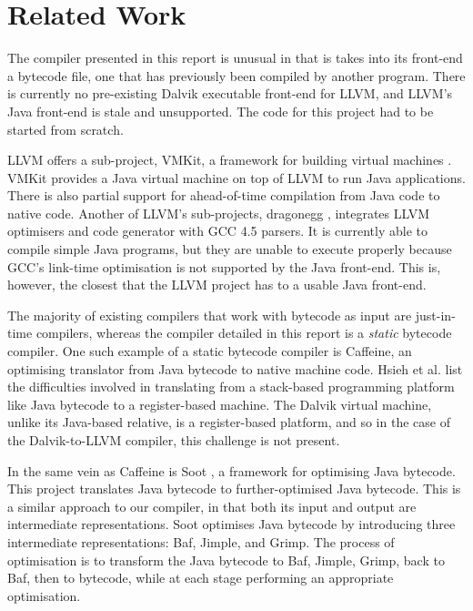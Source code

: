 \chapter{Related Work}
\label{chap:related}

The compiler presented in this report is unusual in that is takes into its front-end a bytecode file, one that has previously been compiled by another program. There is currently no pre-existing Dalvik executable front-end for LLVM, and LLVM's Java front-end is stale and unsupported\footnotemark {}. The code for this project had to be started from scratch.

LLVM offers a sub-project, VMKit, a framework for building virtual machines \cite{geoffray10vmkit}. VMKit provides a Java virtual machine on top of LLVM to run Java applications. There is also partial support for ahead-of-time compilation from Java code to native code. Another of LLVM's sub-projects, dragonegg \cite{dragonegg}, integrates LLVM optimisers and code generator with GCC 4.5 parsers. It is currently able to compile simple Java programs, but they are unable to execute properly because GCC's link-time optimisation is not supported by the Java front-end. This is, however, the closest that the LLVM project has to a usable Java front-end.

The majority of existing compilers that work with bytecode as input are just-in-time compilers, whereas the compiler detailed in this report is a \emph{static} bytecode compiler. One such example of a static bytecode compiler is Caffeine\cite{Hsieh:1996:JBN:243846.243864}, an optimising translator from Java bytecode to native machine code. Hsieh et al. list the difficulties involved in translating from a stack-based programming platform like Java bytecode to a register-based machine. The Dalvik virtual machine, unlike its Java-based relative, is a register-based platform, and so in the case of the Dalvik-to-LLVM compiler, this challenge is not present.

In the same vein as Caffeine is Soot \cite{Vallee-Rai:1999:SJB:781995.782008}, a framework for optimising Java bytecode. This project translates Java bytecode to further-optimised Java bytecode. This is a similar approach to our compiler, in that both its input and output are intermediate representations. Soot optimises Java bytecode by introducing three intermediate representations: Baf, Jimple, and Grimp. The process of optimisation is to transform the Java bytecode to Baf, Jimple, Grimp, back to Baf, then to bytecode, while at each stage performing an appropriate optimisation.

